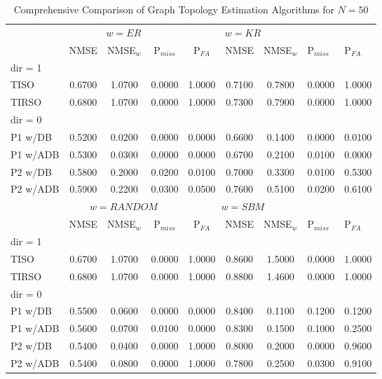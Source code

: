 \begin{table*}[t]
\centering
\caption{Comprehensive Comparison of Graph Topology Estimation Algorithms for $N = 50$}
\label{tab:comprehensive_results}
\begin{tabular}{l|ccc|ccc}
\toprule
&  &  \\
 & NMSE & NMSE$_w$ & P$_{miss}$ & P$_{FA}$ & NMSE & NMSE$_w$ & P$_{miss}$ & P$_{FA}$ \\
\midrule
dir = 1 & & & & & & \\
TISO & 0.6700 & 1.0700 & 0.0000 & 1.0000 & 0.7100 & 0.7800 & 0.0000 & 1.0000 \\
TIRSO & 0.6800 & 1.0700 & 0.0000 & 1.0000 & 0.7300 & 0.7900 & 0.0000 & 1.0000 \\
\midrule
dir = 0 & & & & & & \\
P1 w/DB & 0.5200 & 0.0200 & 0.0000 & 0.0000 & 0.6600 & 0.1400 & 0.0000 & 0.0100 \\
P1 w/ADB & 0.5300 & 0.0300 & 0.0000 & 0.0000 & 0.6700 & 0.2100 & 0.0100 & 0.0000 \\
P2 w/DB & 0.5800 & 0.2000 & 0.0200 & 0.0100 & 0.7000 & 0.3300 & 0.0100 & 0.5300 \\
P2 w/ADB & 0.5900 & 0.2200 & 0.0300 & 0.0500 & 0.7600 & 0.5100 & 0.0200 & 0.6100 \\
\midrule[1.5pt]
&  &  \\
 & NMSE & NMSE$_w$ & P$_{miss}$ & P$_{FA}$ & NMSE & NMSE$_w$ & P$_{miss}$ & P$_{FA}$ \\
\midrule
dir = 1 & & & & & & \\
TISO & 0.6700 & 1.0700 & 0.0000 & 1.0000 & 0.8600 & 1.5000 & 0.0000 & 1.0000 \\
TIRSO & 0.6800 & 1.0700 & 0.0000 & 1.0000 & 0.8800 & 1.4600 & 0.0000 & 1.0000 \\
\midrule
dir = 0 & & & & & & \\
P1 w/DB & 0.5500 & 0.0600 & 0.0000 & 0.0000 & 0.8400 & 0.1100 & 0.1200 & 0.1200 \\
P1 w/ADB & 0.5600 & 0.0700 & 0.0100 & 0.0000 & 0.8300 & 0.1500 & 0.1000 & 0.2500 \\
P2 w/DB & 0.5400 & 0.0400 & 0.0000 & 1.0000 & 0.8000 & 0.2000 & 0.0000 & 0.9600 \\
P2 w/ADB & 0.5400 & 0.0800 & 0.0000 & 1.0000 & 0.7800 & 0.2500 & 0.0300 & 0.9100 \\
\bottomrule
\end{tabular}
\end{table*}